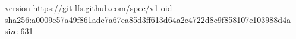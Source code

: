 version https://git-lfs.github.com/spec/v1
oid sha256:a0009e57a49f861ade7a67ea85d3ff613d64a2c4722d8c9f858107e103988d4a
size 631
